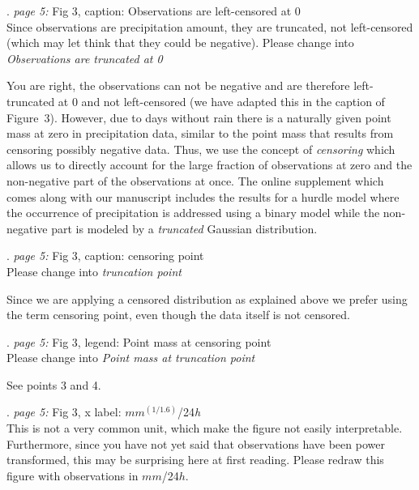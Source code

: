 \documentclass[american,foldmarks=false,noconfig]{uibklttr}
\newenvironment{review}{\fontshape{\itdefault}\fontseries{\bfdefault} \selectfont \smallskip}{\par}
\begin{document}
\begin{review}
3. {\color{quotecolor}\textit{page 5:} Fig 3, caption: Observations 
are left-censored at 0}\\
Since observations are precipitation amount, they are truncated, not 
left-censored (which may let think that they could be negative). 
Please change into \textit{Observations are truncated at 0}
\end{review}

You are right, the observations can not be negative and are 
therefore left-truncated at 0 and not left-censored (we have adapted 
this in the caption of Figure~3). However, due to days without 
rain there is a naturally given point mass at zero in precipitation 
data, similar to the point mass that results from censoring 
possibly negative data.
Thus, we use the concept of \textit{censoring} which allows us to directly
account for the large fraction of observations at zero and the non-negative
part of the observations at once.
The online supplement which comes along with our manuscript includes the
results for a hurdle model where the occurrence of precipitation is addressed
using a binary model while the non-negative part is
modeled by a \textit{truncated} Gaussian distribution.


\begin{review}
4. {\color{quotecolor}\textit{page 5:} Fig 3, caption: censoring point}\\
Please change into \textit{truncation point}
\end{review}

Since we are applying a censored distribution as explained above we 
prefer using the term censoring point, even though the data itself 
is not censored.


\begin{review}
5. {\color{quotecolor}\textit{page 5:} Fig 3, legend: Point mass at 
censoring point}\\
Please change into \textit{Point mass at truncation point}
\end{review}

See points 3 and 4.

\begin{review}
6. {\color{quotecolor}\textit{page 5:} Fig 3, x label: $mm^{(1/1.6)}$/24\textit{h}}\\
This is not a very common unit, which make the figure not easily 
interpretable. Furthermore, since you have not yet said that 
observations have been power transformed, this may be surprising 
here at first reading. Please redraw this figure with 
observations in $mm$/24$h$.
\end{review}
\end{document}

